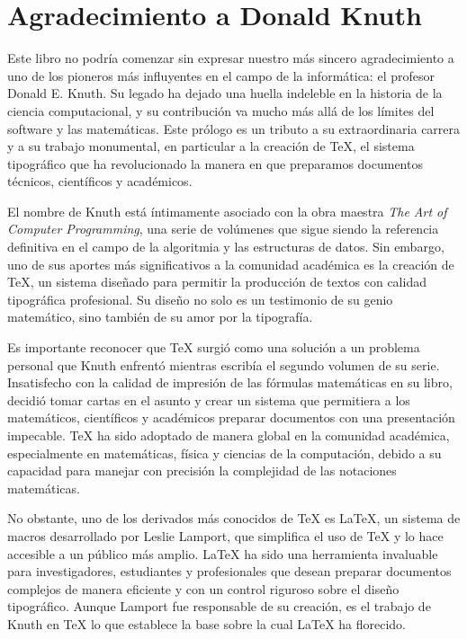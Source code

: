 \chapter[\hspace{2pc}Agradecimiento a Donald Knuth]{Agradecimiento a Donald Knuth}

Este libro no podría comenzar sin expresar nuestro más sincero agradecimiento a uno de los pioneros más influyentes en el campo de la informática: el profesor Donald E. Knuth. Su legado ha dejado una huella indeleble en la historia de la ciencia computacional, y su contribución va mucho más allá de los límites del software y las matemáticas. Este prólogo es un tributo a su extraordinaria carrera y a su trabajo monumental, en particular a la creación de \TeX{}, el sistema tipográfico que ha revolucionado la manera en que preparamos documentos técnicos, científicos y académicos.

El nombre de Knuth está íntimamente asociado con la obra maestra \textit{The Art of Computer Programming}, una serie de volúmenes que sigue siendo la referencia definitiva en el campo de la algoritmia y las estructuras de datos. Sin embargo, uno de sus aportes más significativos a la comunidad académica es la creación de \TeX{}, un sistema diseñado para permitir la producción de textos con calidad tipográfica profesional. Su diseño no solo es un testimonio de su genio matemático, sino también de su amor por la tipografía.

Es importante reconocer que \TeX{} surgió como una solución a un problema personal que Knuth enfrentó mientras escribía el segundo volumen de su serie. Insatisfecho con la calidad de impresión de las fórmulas matemáticas en su libro, decidió tomar cartas en el asunto y crear un sistema que permitiera a los matemáticos, científicos y académicos preparar documentos con una presentación impecable. \TeX{} ha sido adoptado de manera global en la comunidad académica, especialmente en matemáticas, física y ciencias de la computación, debido a su capacidad para manejar con precisión la complejidad de las notaciones matemáticas.

No obstante, uno de los derivados más conocidos de \TeX{} es \LaTeX{}, un sistema de macros desarrollado por Leslie Lamport, que simplifica el uso de \TeX{} y lo hace accesible a un público más amplio. \LaTeX{} ha sido una herramienta invaluable para investigadores, estudiantes y profesionales que desean preparar documentos complejos de manera eficiente y con un control riguroso sobre el diseño tipográfico. Aunque Lamport fue responsable de su creación, es el trabajo de Knuth en \TeX{} lo que establece la base sobre la cual \LaTeX{} ha florecido.

